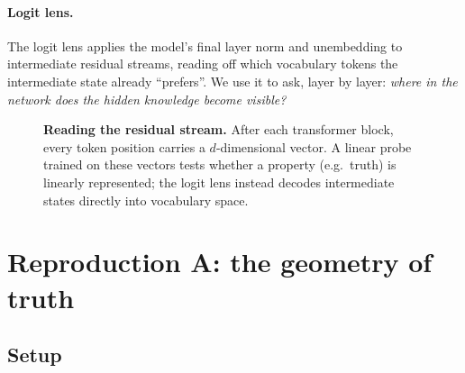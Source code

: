\documentclass{article}
\begin{document}
\paragraph{Logit lens.} The logit lens \citep{nostalgebraist2020logitlens}
applies the model's final layer norm and unembedding to intermediate residual
streams, reading off which vocabulary tokens the intermediate state already
``prefers''. We use it to ask, layer by layer: \emph{where in the network does
the hidden knowledge become visible?}

\begin{figure}[t]
  \centering
  \caption{\textbf{Reading the residual stream.} After each transformer block,
  every token position carries a $d$-dimensional vector. A linear probe trained
  on these vectors tests whether a property (e.g.\ truth) is linearly
  represented; the logit lens instead decodes intermediate states directly into
  vocabulary space.}
  \label{fig:pipeline}
\end{figure}

\section{Reproduction A: the geometry of truth}
\label{sec:got}

\subsection{Setup}
\label{sec:got-setup}
\end{document}
